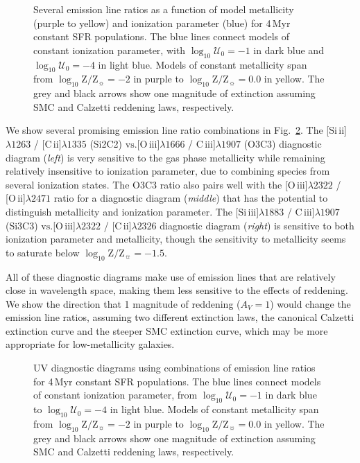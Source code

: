 \documentclass[preprint2]{aastex61}
\newcommand{\oiii}{[O\,{\sc iii}]\xspace}
\newcommand{\oii}{[O\,{\sc ii}]\xspace}
\newcommand{\SiuII}{[Si\,{\sc ii}]\xspace}
\newcommand{\SiuIII}{[Si\,{\sc iii}]\xspace}
\newcommand{\ciii}{C\,{\sc iii}]\xspace}
\newcommand{\cii}{[C\,{\sc ii}]\xspace}
\newcommand\vs{\ensuremath{\mathrm{vs.}}\xspace}
\newcommand{\Myr}{$\,$Myr\xspace}
\newcommand{\logten}{\ensuremath{\log_{10}}}
\newcommand{\logZeq}[1]{\ensuremath{\logten \mathrm{Z}/\mathrm{Z}_{\sun} = #1}}
\newcommand{\logUeq}[1]{\ensuremath{\logten \mathcal{U}_0 = #1}}
\begin{document}
\begin{figure}
  \begin{center}
    \caption{Several emission line ratios as a function of model metallicity (purple to yellow) and ionization parameter (blue) for 4\Myr constant SFR populations. The blue lines connect models of constant ionization parameter, with \logUeq{-1} in dark blue and \logUeq{-4} in light blue. Models of constant metallicity span from \logZeq{-2} in purple to \logZeq{0.0} in yellow. The grey and black arrows show one magnitude of extinction assuming SMC and Calzetti reddening laws, respectively.}
    \label{fig:RatioVsLogZ}
  \end{center}
\end{figure}


We show several promising emission line ratio combinations in Fig.~\ref{fig:RatioRatio}. The \SiuII$\lambda1263$ / \cii$\lambda1335$ (Si2C2) \vs \oiii$\lambda1666$ / \ciii$\lambda1907$ (O3C3) diagnostic diagram (\emph{left}) is very sensitive to the gas phase metallicity while remaining relatively insensitive to ionization parameter, due to combining species from several ionization states. The O3C3 ratio also pairs well with the \oiii$\lambda2322$ / \oii$\lambda2471$ ratio for a diagnostic diagram (\emph{middle}) that has the potential to distinguish metallicity and ionization parameter. The \SiuIII$\lambda1883$ / \ciii$\lambda1907$ (Si3C3) \vs \oiii$\lambda2322$ / \cii$\lambda2326$ diagnostic diagram (\emph{right}) is sensitive to both ionization parameter and metallicity, though the sensitivity to metallicity seems to saturate below \logZeq{-1.5}.

All of these diagnostic diagrams make use of emission lines that are relatively close in wavelength space, making them less sensitive to the effects of reddening. We show the direction that 1 magnitude of reddening ($A_V=1$) would change the emission line ratios, assuming two different extinction laws, the canonical Calzetti extinction curve and the steeper SMC extinction curve, which may be more appropriate for low-metallicity galaxies.

\begin{figure}
  \begin{center}
    \caption{UV diagnostic diagrams using combinations of emission line ratios for 4\Myr constant SFR populations. The blue lines connect models of constant ionization parameter, from \logUeq{-1} in dark blue to \logUeq{-4} in light blue. Models of constant metallicity span from \logZeq{-2} in purple to \logZeq{0.0} in yellow. The grey and black arrows show one magnitude of extinction assuming SMC and Calzetti reddening laws, respectively.}
    \label{fig:RatioRatio}
  \end{center}
\end{figure}
\end{document}
